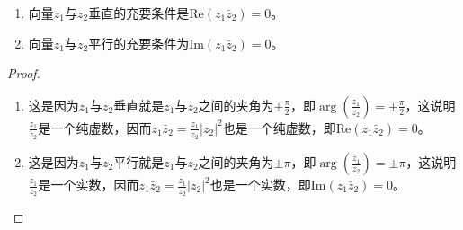\documentclass[../../main.tex]{subfiles}
\begin{document}
\begin{proposition}\label{proposition:复平面向量垂直与平行的充要条件}
\begin{enumerate}[(1)]
\item 向量\(z_1\)与\(z_2\)垂直的充要条件是\(\mathrm{Re}(z_1\bar{z}_2) = 0\)。

\item 向量\(z_1\)与\(z_2\)平行的充要条件为\(\mathrm{Im}(z_1\bar{z}_2) = 0\)。
\end{enumerate}
\end{proposition}
\begin{proof}
\begin{enumerate}[(1)]
\item 这是因为\(z_1\)与\(z_2\)垂直就是\(z_1\)与\(z_2\)之间的夹角为\(\pm \frac{\pi}{2}\)，即\(\arg\left( \frac{z_1}{z_2} \right) = \pm \frac{\pi}{2}\)，这说明\(\frac{z_1}{z_2}\)是一个纯虚数，因而\(z_1\bar{z}_2 = \frac{z_1}{z_2}|z_2|^2\)也是一个纯虚数，即\(\mathrm{Re}(z_1\bar{z}_2) = 0\)。

\item 这是因为\(z_1\)与\(z_2\)平行就是\(z_1\)与\(z_2\)之间的夹角为\(\pm \pi\)，即\(\arg\left( \frac{z_1}{z_2} \right) = \pm \pi\)，这说明\(\frac{z_1}{z_2}\)是一个实数，因而\(z_1\bar{z}_2 = \frac{z_1}{z_2}|z_2|^2\)也是一个实数，即\(\mathrm{Im}(z_1\bar{z}_2) = 0\)。
\end{enumerate}

\end{proof}
\end{document}
